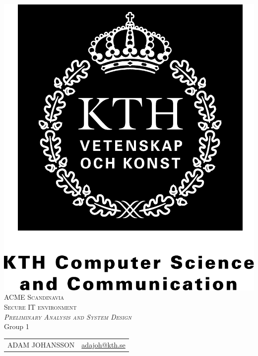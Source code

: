 \documentclass[a4paper,12pt,oneside]{article}
\begin{document}


\begin{titlepage}
    \begin{center}
        \includegraphics[scale=0.2]{figures/kth_svv_comp_science_comm.pdf}\\
        \vspace{2cm}
        \textsc{\LARGE ACME Scandinavia}\\
        \vspace{0.5cm}
        \textsc{\large Secure IT environment}\\
        \vspace{1cm}
        \textsc{\large\textit{Preliminary Analysis and System Design}}\\
        \vspace{5.5cm}
        Group 1\\
        \vspace{0.5cm}
        \begin{tabular}{ l  r }
            ADAM JOHANSSON          &   \small{\href{mailto:adajoh@kth.se}{adajoh@kth.se}}      \\

\end{tabular}
\end{center}
\end{titlepage}
\end{document}
